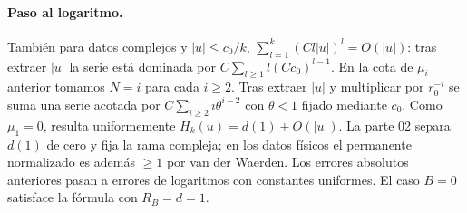 \paragraph{Paso al logaritmo.}
También para datos complejos y $|u|\le c_0/k$,
$\sum_{l=1}^k(Cl|u|)^l=O(|u|)$: tras extraer $|u|$ la serie está dominada por
$C\sum_{l\ge1}l(Cc_0)^{l-1}$. En la cota de $\mu_i$ anterior tomamos $N=i$
para cada $i\ge2$. Tras extraer $|u|$ y multiplicar por $r_0^{-i}$ se suma una
serie acotada por $C\sum_{i\ge2}i\theta^{i-2}$ con $\theta<1$ fijado mediante $c_0$.
Como $\mu_1=0$, resulta uniformemente $H_k(u)=d(1)+O(|u|)$.
La parte 02 separa $d(1)$ de cero y fija la rama compleja; en los datos físicos el
permanente normalizado es además $\ge1$ por van der Waerden.
Los errores absolutos anteriores pasan a errores de logaritmos con constantes uniformes.
El caso $B=0$ satisface la fórmula con $R_B=d=1$.
